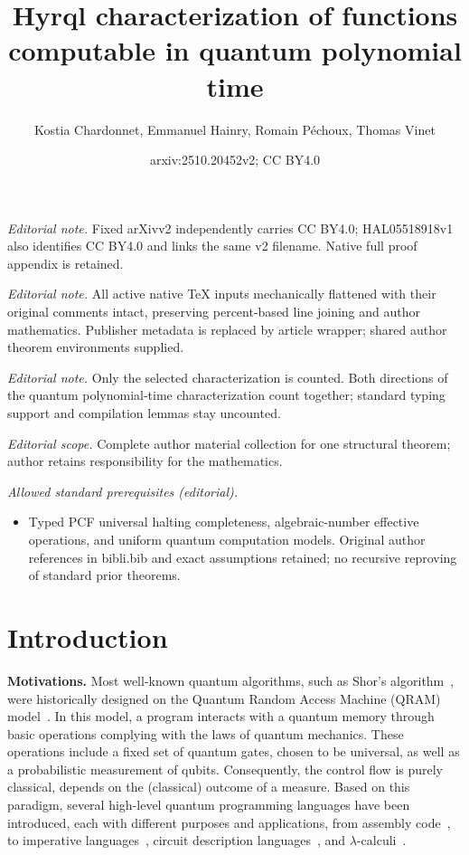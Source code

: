 \documentclass[10pt,a4paper]{article}
\title{Hyrql characterization of functions computable in quantum polynomial time}
\author{Kostia Chardonnet, Emmanuel Hainry, Romain Péchoux, Thomas Vinet}
\date{arxiv:2510.20452v2; CC BY4.0}
\newcommand{\ie}{\text{i.e., }}
\begin{document}
\maketitle
\noindent\textit{Editorial note.} Fixed arXivv2 independently carries CC BY4.0; HAL05518918v1 also identifies CC BY4.0 and links the same v2 filename. Native full proof appendix is retained.\par\medskip
\noindent\textit{Editorial note.} All active native TeX inputs mechanically flattened with their original comments intact, preserving percent-based line joining and author mathematics. Publisher metadata is replaced by article wrapper; shared author theorem environments supplied.\par\medskip
\noindent\textit{Editorial note.} Only the selected characterization is counted. Both directions of the quantum polynomial-time characterization count together; standard typing support and compilation lemmas stay uncounted.\par\medskip
\noindent\textit{Editorial scope.} Complete author material collection for one structural theorem; author retains responsibility for the mathematics.\par\medskip
\noindent\textit{Allowed standard prerequisites (editorial).}\begin{itemize}
\item Typed PCF universal halting completeness, algebraic-number effective operations, and uniform quantum computation models. Original author references in bibli.bib and exact assumptions retained; no recursive reproving of standard prior theorems.
\end{itemize}\medskip
\section{Introduction}
\label{sec:intro}

\textbf{Motivations. }
Most well-known quantum algorithms, such as Shor's algorithm~\cite{Sho97}, were
historically designed on the Quantum Random Access Machine (QRAM)
model~\cite{Kni22}. In this model, a program
interacts with a quantum memory through basic operations complying with the
laws of quantum mechanics. These operations include a fixed set of quantum
gates, chosen to be universal, as well as a probabilistic measurement of
qubits. Consequently, the control flow is purely classical, \ie depends on the
(classical) outcome of a measure. Based on  this paradigm, several high-level
quantum programming languages have been introduced, each with different
purposes and applications, from assembly code~\cite{QASM17,QASM22}, to
imperative languages~\cite{FY21}, circuit description languages~\cite{GLRSV13},
and $\lambda$-calculi~\cite{SV09}.
\end{document}
